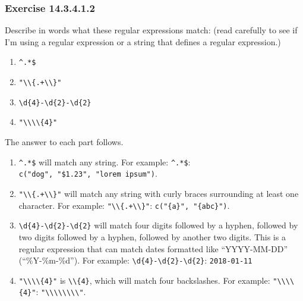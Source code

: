 \documentclass[]{book}
\providecommand{\tightlist}{%
  \setlength{\itemsep}{0pt}\setlength{\parskip}{0pt}}
\theoremstyle{plain}
\theoremstyle{remark}
\begin{document}
\hypertarget{exercise-14.3.4.1.2}{%
\subsubsection*{\texorpdfstring{Exercise
{14.3.4.1.2}}{Exercise 14.3.4.1.2}}\label{exercise-14.3.4.1.2}}

Describe in words what these regular expressions match: (read carefully
to see if I'm using a regular expression or a string that defines a
regular expression.)

\begin{enumerate}
\def\labelenumi{\arabic{enumi}.}
\tightlist
\item
  \texttt{\^{}.*\$}
\item
  \texttt{"\textbackslash{}\textbackslash{}\{.+\textbackslash{}\textbackslash{}\}"}
\item
  \texttt{\textbackslash{}d\{4\}-\textbackslash{}d\{2\}-\textbackslash{}d\{2\}}
\item
  \texttt{"\textbackslash{}\textbackslash{}\textbackslash{}\textbackslash{}\{4\}"}
\end{enumerate}

The answer to each part follows.

\begin{enumerate}
\def\labelenumi{\arabic{enumi}.}
\item
  \texttt{\^{}.*\$} will match any string. For example:
  \texttt{\^{}.*\$}: \texttt{c("dog",\ "\$1.23",\ "lorem\ ipsum")}.
\item
  \texttt{"\textbackslash{}\textbackslash{}\{.+\textbackslash{}\textbackslash{}\}"}
  will match any string with curly braces surrounding at least one
  character. For example:
  \texttt{"\textbackslash{}\textbackslash{}\{.+\textbackslash{}\textbackslash{}\}"}:
  \texttt{c("\{a\}",\ "\{abc\}")}.
\item
  \texttt{\textbackslash{}d\{4\}-\textbackslash{}d\{2\}-\textbackslash{}d\{2\}}
  will match four digits followed by a hyphen, followed by two digits
  followed by a hyphen, followed by another two digits. This is a
  regular expression that can match dates formatted like ``YYYY-MM-DD''
  (``\%Y-\%m-\%d''). For example:
  \texttt{\textbackslash{}d\{4\}-\textbackslash{}d\{2\}-\textbackslash{}d\{2\}}:
  \texttt{2018-01-11}
\item
  \texttt{"\textbackslash{}\textbackslash{}\textbackslash{}\textbackslash{}\{4\}"}
  is \texttt{\textbackslash{}\textbackslash{}\{4\}}, which will match
  four backslashes. For example:
  \texttt{"\textbackslash{}\textbackslash{}\textbackslash{}\textbackslash{}\{4\}"}:
  \texttt{"\textbackslash{}\textbackslash{}\textbackslash{}\textbackslash{}\textbackslash{}\textbackslash{}\textbackslash{}\textbackslash{}"}.
\end{enumerate}
\end{document}
